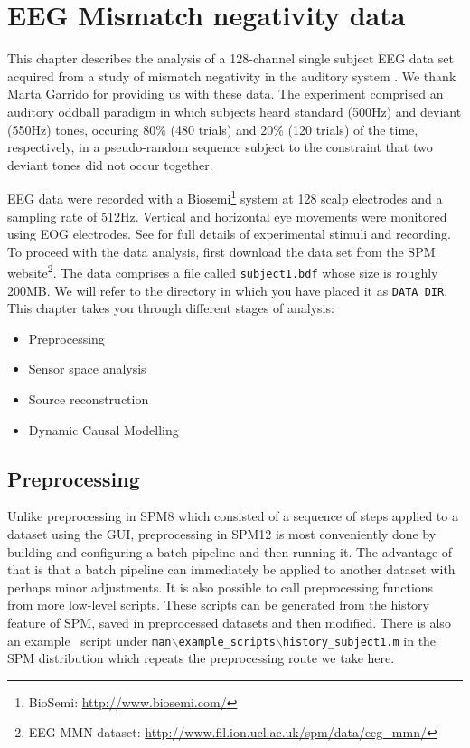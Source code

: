 \chapter{EEG Mismatch negativity data\label{Chap:data:mmn}}

This chapter describes the analysis of a 128-channel single subject EEG data set acquired from a study of mismatch negativity in the auditory system \cite{marta_mmndcm}. We thank Marta Garrido for providing us with these data. The experiment comprised an auditory oddball paradigm in which subjects heard standard (500Hz) and deviant (550Hz) tones, occuring 80\% (480 trials) and 20\% (120 trials) of the time, respectively, in a pseudo-random sequence subject to the constraint that two deviant tones did not occur together.

EEG data were recorded with a Biosemi\footnote{BioSemi: \url{http://www.biosemi.com/}} system at 128 scalp electrodes and a sampling rate of 512Hz. Vertical and horizontal eye movements were monitored using EOG electrodes. See \cite{marta_mmndcm} for full details of experimental stimuli and recording. To proceed with the data analysis, first download the  data set from the SPM website\footnote{EEG MMN dataset: \url{http://www.fil.ion.ucl.ac.uk/spm/data/eeg\_mmn/}}. The data comprises a file called \texttt{subject1.bdf} whose size is roughly 200MB. We will refer to the directory in which you have placed it as \texttt{DATA\_DIR}. This chapter takes you through different stages of analysis:

\begin{itemize}
\item{Preprocessing}
\item{Sensor space analysis}
\item{Source reconstruction}
\item{Dynamic Causal Modelling}
\end{itemize}

\section{Preprocessing}

Unlike preprocessing in SPM8 which consisted of a sequence of steps applied to a dataset using the GUI, preprocessing in SPM12 is most conveniently done by building and configuring a batch pipeline and then running it. The advantage of that is that a batch pipeline can immediately be applied to another dataset with perhaps minor adjustments. It is also possible to call preprocessing functions from more low-level scripts. These scripts can be generated from the history feature of SPM, saved in preprocessed datasets and then modified.  There is also an example \matlab\ script under \texttt{man$\backslash$example\_scripts$\backslash$history\_subject1.m} in the SPM distribution which repeats the preprocessing route we take here.

